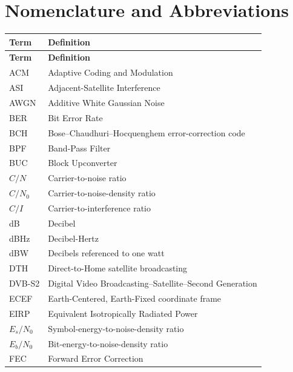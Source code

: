 \section*{Nomenclature and Abbreviations}

\setcounter{nomenclatureSavedTable}{\value{table}}
\small
\renewcommand{\arraystretch}{1.18}
\setlength{\tabcolsep}{5pt}
\begin{longtable}{@{}>{\raggedright\arraybackslash}p{}>{\raggedright\arraybackslash}p{}@{}}
    \rowcolor{tableHeader}
    \color{white}\textbf{Term} & \color{white}\textbf{Definition} \\
    \midrule
    \endfirsthead
    \rowcolor{tableHeader}
    \color{white}\textbf{Term} & \color{white}\textbf{Definition} \\
    \midrule
    \endhead
    ACM & Adaptive Coding and Modulation \\
    ASI & Adjacent-Satellite Interference \\
    AWGN & Additive White Gaussian Noise \\
    BER & Bit Error Rate \\
    BCH & Bose--Chaudhuri--Hocquenghem error-correction code \\
    BPF & Band-Pass Filter \\
    BUC & Block Upconverter \\
    $C/N$ & Carrier-to-noise ratio \\
    $C/N_0$ & Carrier-to-noise-density ratio \\
    $C/I$ & Carrier-to-interference ratio \\
    dB & Decibel \\
    dBHz & Decibel-Hertz \\
    dBW & Decibels referenced to one watt \\
    DTH & Direct-to-Home satellite broadcasting \\
    DVB-S2 & Digital Video Broadcasting--Satellite--Second Generation \\
    ECEF & Earth-Centered, Earth-Fixed coordinate frame \\
    EIRP & Equivalent Isotropically Radiated Power \\
    $E_s/N_0$ & Symbol-energy-to-noise-density ratio \\
    $E_b/N_0$ & Bit-energy-to-noise-density ratio \\
    FEC & Forward Error Correction \\

\end{longtable}
